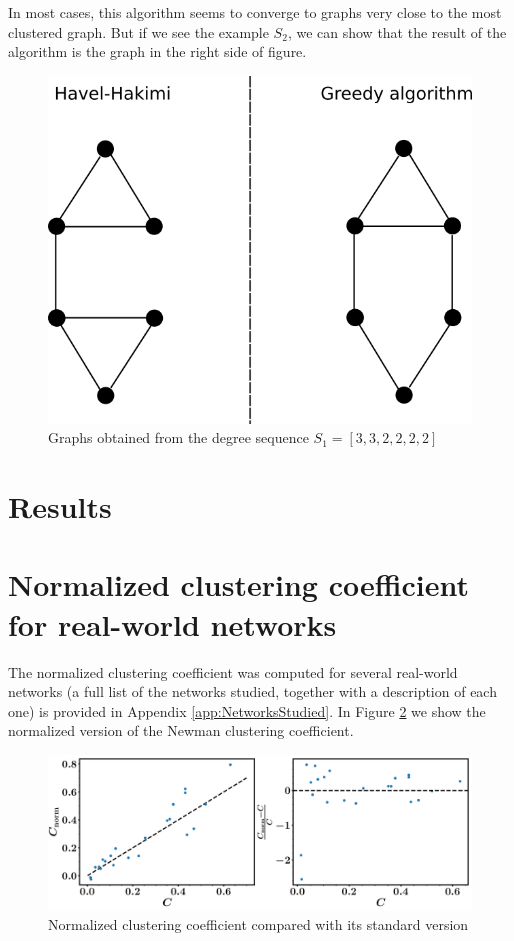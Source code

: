 \documentclass{article}
\begin{document}
In most cases, this algorithm seems to converge to graphs very close to the most clustered graph. But if we see the example $S_2$, we can show that the result of the algorithm is the graph in the right side of figure.

\begin{figure}[ht!]
\centering
\includegraphics[scale=0.8]{./figs/graph_332222.png}
\caption{Graphs obtained from the degree sequence $S_1 = [3, 3, 2, 2, 2, 2]$}
\label{fig:graph_332222}
\end{figure}


\section{Results}

\section{Normalized clustering coefficient for real-world networks}

The normalized clustering coefficient was computed for several real-world networks (a full list of the networks studied, together with a description of each one) is provided in Appendix \ref{app:NetworksStudied}. In Figure \ref{fig:Cnorm_vs_C} we show the normalized version of the Newman clustering coefficient.

\begin{figure}[ht!]
\centering
\includegraphics[scale=0.4]{./figs/Cnorm_vs_C}
\caption{Normalized clustering coefficient compared with its standard version}
\label{fig:Cnorm_vs_C}
\end{figure}
\end{document}
